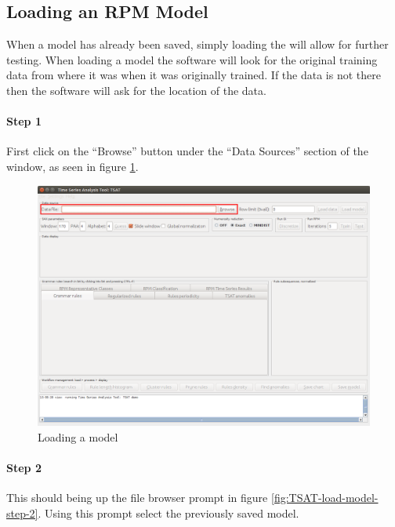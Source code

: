 \documentclass[letterpaper, 12pt]{article}
\begin{document}
\newpage
\subsection{Loading an RPM Model}
\label{RPMLoading}
When a model has already been saved, simply loading the will allow for further testing. When loading a model the software will look for the original training data from where it was when it was originally trained. If the data is not there then the software will ask for the location of the data.

\paragraph{Step 1}
First click on the ``Browse'' button under the ``Data Sources'' section of the window, as seen in figure \ref{fig:TSAT-load-model-step-1}. 

\begin{figure}[h]
	\includegraphics[width=\textwidth]{TSAT-load-model-step-1}
	\caption{Loading a model}
	\label{fig:TSAT-load-model-step-1}
\end{figure}

\newpage
\paragraph{Step 2}
This should being up the file browser prompt in figure \ref{fig:TSAT-load-model-step-2}. Using this prompt select the previously saved model.
\end{document}
